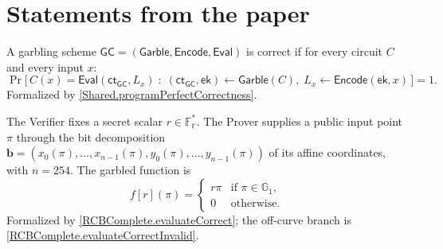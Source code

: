 
\section{Statements from the paper}

\begin{paperdef}\label{babe:def3-correctness}
A garbling scheme $\mathsf{GC} = (\mathsf{Garble}, \mathsf{Encode}, \mathsf{Eval})$ is correct if for every circuit $C$ and every input $x$:
\[
  \Pr\big[\, C(x) = \mathsf{Eval}(\mathsf{ct}_{\mathsf{GC}}, L_x) \;:\; (\mathsf{ct}_{\mathsf{GC}}, \mathsf{ek}) \gets \mathsf{Garble}(C),\; L_x \gets \mathsf{Encode}(\mathsf{ek}, x) \,\big] = 1 .
\]
Formalized by \cref{Shared.programPerfectCorrectness}.
\end{paperdef}

\begin{paperdef}\label{babe:eq27}
The Verifier fixes a secret scalar $r \in \mathbb{F}_{\mathbb{r}}^*$.
The Prover supplies a public input point $\pi$ through the bit decomposition $\mathbf{b} = (x_0(\pi), \ldots, x_{n-1}(\pi), y_0(\pi), \ldots, y_{n-1}(\pi))$ of its affine coordinates, with $n = 254$.
The garbled function is
\[
  f[r](\pi) = \begin{cases} r\pi & \text{if } \pi \in \mathbb{G}_1, \\ 0 & \text{otherwise.} \end{cases}
\]
Formalized by \cref{RCBComplete.evaluateCorrect}; the off-curve branch is \cref{RCBComplete.evaluateCorrectInvalid}.
\end{paperdef}

